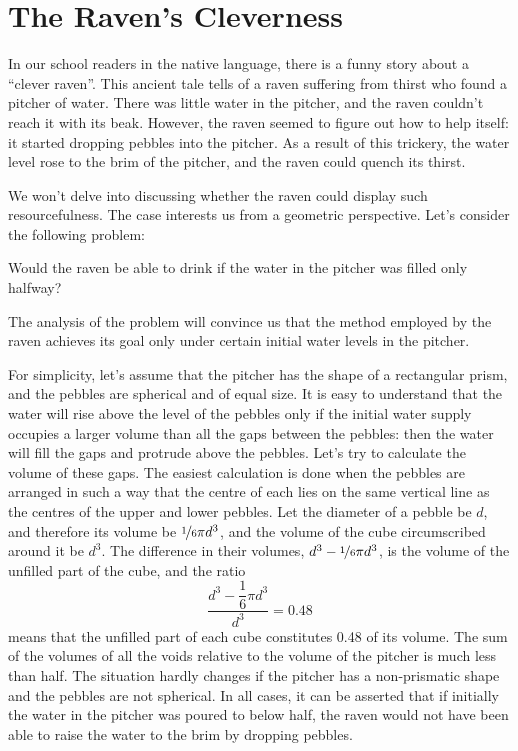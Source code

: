 \clearpage

\section{The Raven's Cleverness}
\label{sec-9.14}

In our school readers in the native language, there is a funny story about a ``clever raven''. This ancient tale tells of a raven suffering from thirst who found a pitcher of water. There was little water in the pitcher, and the raven couldn't reach it with its beak. However, the raven seemed to figure out how to help itself: it started dropping pebbles into the pitcher. As a result of this trickery, the water level rose to the brim of the pitcher, and the raven could quench its thirst.

We won't delve into discussing whether the raven could display such resourcefulness. The case interests us from a geometric perspective. Let's consider the following problem:

\ques Would the raven be able to drink if the water in the pitcher was filled only halfway?



\ans The analysis of the problem will convince us that the method employed by the raven achieves its goal only under certain initial water levels in the pitcher.

For simplicity, let's assume that the pitcher has the shape of a rectangular prism, and the pebbles are spherical and of equal size. It is easy to understand that the water will rise above the level of the pebbles only if the initial water supply occupies a larger volume than all the gaps between the pebbles: then the water will fill the gaps and protrude above the pebbles. Let's try to calculate the volume of these gaps. The easiest calculation is done when the pebbles are arranged in such a way that the centre of each lies on the same vertical line as the centres of the upper and lower pebbles. Let the diameter of a pebble be $d$, and therefore its volume be $\nicefrac{1}{6} \pi d^{3}$, and the volume of the cube circumscribed around it be $d^{3}$. The difference in their volumes, $d^{3} - \nicefrac{1}{6} \pi d^{3}$, is the volume of the unfilled part of the cube, and the ratio 
\begin{equation*}%
\frac{d^{3} - \dfrac{1}{6} \pi d^{3}}{d^{3}} = 0.48
\end{equation*}
means that the unfilled part of each cube constitutes 0.48 of its volume. The sum of the volumes of all the voids relative to the volume of the pitcher is much less than half. The situation hardly changes if the pitcher has a non-prismatic shape and the pebbles are not spherical. In all cases, it can be asserted that if initially the water in the pitcher was poured to below half, the raven would not have been able to raise the water to the brim by dropping pebbles.

